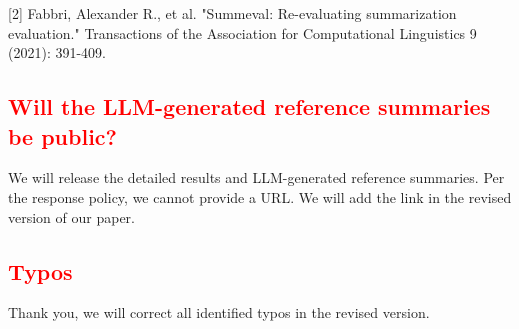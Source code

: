 \documentclass[a4paper]{article}
\begin{document}
[2] Fabbri, Alexander R., et al. "Summeval: Re-evaluating summarization evaluation." Transactions of the Association for Computational Linguistics 9 (2021): 391-409.



\subsection{\textcolor{red}{Will the LLM-generated reference summaries be public?}}
We will release the detailed results and LLM-generated reference summaries. Per the response policy, we cannot provide a URL. We will add the link in the revised version of our paper.


\subsection{\textcolor{red}{Typos}}
Thank you, we will correct all identified typos in the revised version.
\end{document}
